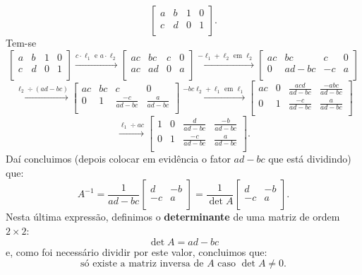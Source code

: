 \documentclass[../livro.tex]{subfiles}  %
\begin{document}
\[
\left[
\begin{array}{cc|cc}
a & b & 1 & 0 \\
c & d & 0 & 1 \\
\end{array}
\right].
\] Tem-se
\[
\left[
\begin{array}{cc|cc}
a & b & 1 & 0 \\
c & d & 0 & 1 \\
\end{array}
\right] \xrightarrow{c\cdot \ell_1 \text{ e } a\cdot \ell_2}
\left[
\begin{array}{cc|cc}
ac & bc & c & 0 \\
ac & ad & 0 & a \\
\end{array}
\right] \xrightarrow{-\ell_1 + \ell_2 \text{ em } \ell_2}
\left[
\begin{array}{cc|cc}
ac & bc      & c  & 0 \\
0 & ad - bc & -c & a \\
\end{array}
\right]
\]
\[
\xrightarrow{\ell_2 \div (ad-bc)}
\left[
\begin{array}{cc|cc}
ac & bc      & c  & 0 \\
0 & 1 & \frac{-c}{ad - bc} & \frac{a}{ad - bc} \\
\end{array}
\right]  \xrightarrow{-bc\ell_2 + \ell_1 \text{ em } \ell_1}
\left[
\begin{array}{cc|cc}
ac & 0 & \frac{acd}{ad - bc} & \frac{-abc}{ad - bc} \\
0 & 1 & \frac{-c}{ad - bc}  & \frac{a}{ad - bc} \\
\end{array}
\right]
\]
\[
\xrightarrow{\ell_1 \div ac}
\left[
\begin{array}{cc|cc}
1 & 0 & \frac{ d}{ad - bc}  & \frac{-b}{ad - bc} \\
0 & 1 & \frac{-c}{ad - bc}  & \frac{ a}{ad - bc} \\
\end{array}
\right].
\] Daí concluimos (depois colocar em evidência o fator $ad - bc$ que está dividindo) que:
\[
\boxed{A^{-1} = \frac{1}{ad - bc} \left[
	\begin{array}{cc}
	d  & -b  \\
	-c & a \\
	\end{array}
	\right] =
	\frac{1}{\det A} \left[
	\begin{array}{cc}
	d  & -b  \\
	-c & a \\
	\end{array}
	\right].}
\] Nesta última expressão, definimos o \textbf{determinante} de uma matriz de ordem $2\times 2$:
\[
\det A = ad - bc
\] e, como foi necessário dividir por este valor, concluimos que:
\[
\boxed{\text{só existe a matriz inversa de $A$ caso $\det A \neq 0$.}}
\]
\end{document}
